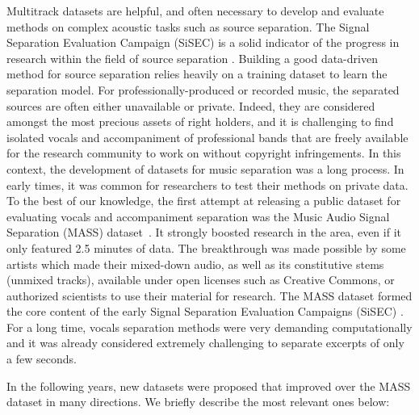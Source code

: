 Multitrack datasets are helpful, and often necessary to develop and evaluate methods on complex acoustic tasks such as source separation.
The Signal Separation Evaluation Campaign (SiSEC) is a solid indicator of the progress in research within the field of source separation \cite{sisec13, ono15, liutkus17, stoeter18sisec}.
Building a good data-driven method for source separation relies heavily on a training dataset to learn the separation model. 
For professionally-produced or recorded music, the separated sources are often either unavailable or private. 
Indeed, they are considered amongst the most precious assets of right holders, and it is challenging to find isolated vocals and accompaniment of professional bands that are freely available for the research community to work on without copyright infringements.
In this context, the development of datasets for music separation was a long process. 
In early times, it was common for researchers to test their methods on private data. 
To the best of our knowledge, the first attempt at releasing a public dataset for evaluating vocals and accompaniment separation was the Music Audio Signal Separation (MASS) dataset~\cite{MTGMASSdb}.
It strongly boosted research in the area, even if it only featured 2.5 minutes of data. The breakthrough was made possible by some artists which made their mixed-down audio, as well as its constitutive stems (unmixed tracks), available under open licenses such as Creative Commons, or authorized scientists to use their material for research.
% 
The MASS dataset formed the core content of the early Signal Separation Evaluation Campaigns (SiSEC) \cite{vincent09}. 
For a long time, vocals separation methods were very demanding computationally and it was already considered extremely challenging to separate excerpts of only a few seconds.

In the following years, new datasets were proposed that improved over the MASS dataset in many directions. 
We briefly describe the most relevant ones below:

